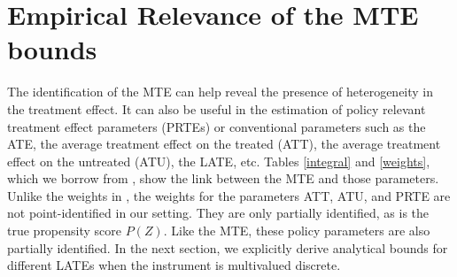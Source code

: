 \documentclass[11pt,reqno]{amsart}
\theoremstyle{plain}
\numberwithin{equation}{section}
\begin{document}
\section{Empirical Relevance of the MTE bounds}\label{EmpRel}
The identification of the MTE can help reveal the presence of heterogeneity in the treatment effect. It can also be useful in the estimation of policy relevant treatment effect parameters (PRTEs) or conventional parameters such as the ATE, the average treatment effect on the treated (ATT), the average treatment effect on the untreated (ATU), the LATE, etc. Tables \ref{integral} and \ref{weights}, which we borrow from \cite{heckman2005structural}, show the link between the MTE and those parameters. Unlike the weights in \cite{heckman2005structural}, the weights for the parameters ATT, ATU, and PRTE are not point-identified in our setting. They are only partially identified, as is the true propensity score $P(Z)$. Like the MTE, these policy parameters are also partially identified. In the next section, we explicitly derive analytical bounds for different LATEs when the instrument is multivalued discrete. 
\end{document}
